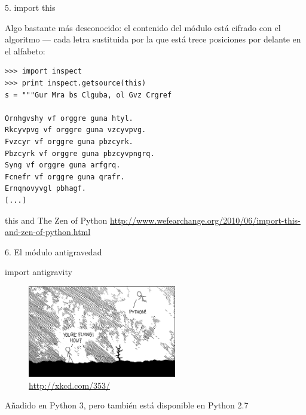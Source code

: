 \documentclass[14pt]{beamer}
\begin{document}
\begin{frame}[fragile]{5. import this}
  \small
  \begin{center}
    Algo bastante más desconocido: el contenido del módulo
     está cifrado con el algoritmo
     --- cada letra sustituida por la que está trece
    posiciones por delante en el alfabeto:
  \end{center}

  \begin{exampleblock}{}
    \tiny
    \begin{lstlisting}
>>> import inspect
>>> print inspect.getsource(this)
s = """Gur Mra bs Clguba, ol Gvz Crgref

Ornhgvshy vf orggre guna htyl.
Rkcyvpvg vf orggre guna vzcyvpvg.
Fvzcyr vf orggre guna pbzcyrk.
Pbzcyrk vf orggre guna pbzcyvpngrq.
Syng vf orggre guna arfgrq.
Fcnefr vf orggre guna qrafr.
Ernqnovyvgl pbhagf.
[...]
    \end{lstlisting}
  \end{exampleblock}

  \scriptsize
  \begin{block}{\centering this and The Zen of Python}
    \centering
    \url{http://www.wefearchange.org/2010/06/import-this-and-zen-of-python.html}
  \end{block}
\end{frame}

\begin{frame}{6. El módulo antigravedad}
  \Large
  \begin{block}{}
    \centering import antigravity
  \end{block}{}

  \begin{figure}
    \centering
    \includegraphics[height=4cm]{pics/xkcd-353.png}
    \caption{\url{http://xkcd.com/353/}}
  \end{figure}

  \vspace{-0.75cm}

  \small
  \begin{alertblock}{}
    \centering
    Añadido en Python 3, pero también está disponible en Python 2.7
  \end{alertblock}
\end{frame}
\end{document}
